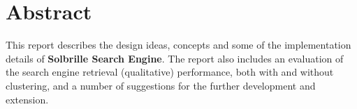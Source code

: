 \chapter*{Abstract} 
\thispagestyle{empty} %
This report describes the design ideas, concepts and some of the implementation details of {\bf Solbrille Search Engine}. The report also includes an evaluation of the search engine retrieval (qualitative) performance, both with and without clustering, and a number of suggestions for the further development and extension.